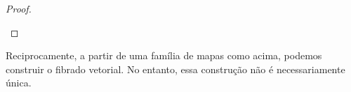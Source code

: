 \begin{proof}
\begin{enumerate}

	\end{enumerate}
\end{proof}

Reciprocamente, a partir de uma família de mapas como acima, podemos construir o fibrado vetorial. No entanto, essa construção não é necessariamente única.

